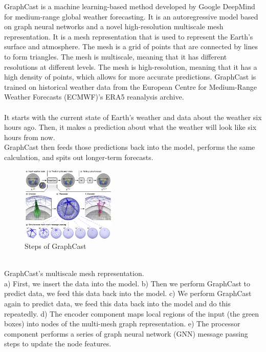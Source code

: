 \documentclass[../paper.tex]{subfiles}
\begin{document}
    GraphCast is a machine learning-based method developed by Google DeepMind for medium-range global weather forecasting.
    It is an autoregressive model based on graph neural networks and a novel high-resolution multiscale mesh representation.
    It is a mesh representation that is used to represent the Earth's surface and atmosphere.
    The mesh is a grid of points that are connected by lines to form triangles.
    The mesh is multiscale, meaning that it has different resolutions at different levels.
    The mesh is high-resolution, meaning that it has a high density of points, which allows for more accurate predictions.
    GraphCast is trained on historical weather data from the European Centre for Medium-Range Weather Forecasts (ECMWF)'s ERA5 reanalysis archive\cite{e1}.
    \\\\
    It starts with the current state of Earth's weather and data about the weather six hours ago.
    Then, it makes a prediction about what the weather will look like six hours from now.\\
    GraphCast then feeds those predictions back into the model, performs the same calculation, and spits out longer-term forecasts\cite{e1}.\\
    \begin{figure}[htbp]
        \centerline{\includegraphics[width=0.4\textwidth]{../photos/multimesh_graphcast}}
        \caption{Steps of GraphCast}
        \label{fig:multimesh-graphcast}
    \end{figure}\\
    GraphCast's multiscale mesh representation. \\
    a) First, we insert the data into the model.
    b) Then we perform GraphCast to predict data, we feed this data back into the model.
    c) We perform GraphCast again to predict data, we feed this data back into the model and do this repeatedly.
    d) The encoder component maps local regions of the input (the green boxes) into nodes of the multi-mesh graph representation.
    e) The processor component performs a series of graph neural network (GNN) message passing steps to update the node features.
\end{document}
